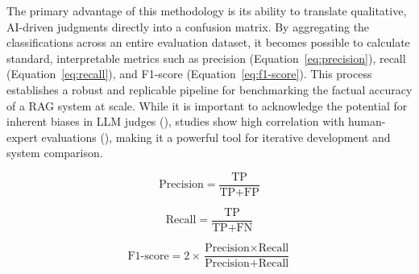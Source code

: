             The primary advantage of this methodology is its ability to translate qualitative, AI-driven judgments directly into a confusion matrix. By aggregating the classifications across an entire evaluation dataset, it becomes possible to calculate standard, interpretable metrics such as precision (Equation~\ref{eq:precision}), recall (Equation~\ref{eq:recall}), and F1-score (Equation~\ref{eq:f1-score}). This process establishes a robust and replicable pipeline for benchmarking the factual accuracy of a RAG system at scale. While it is important to acknowledge the potential for inherent biases in LLM judges (\cite{Gu2025}), studies show high correlation with human-expert evaluations (\cite{li2024llmsasjudgescomprehensivesurveyllmbased}), making it a powerful tool for iterative development and system comparison.

            \begin{equation}
                \text{Precision} = \frac{\text{TP}}{\text{TP} + \text{FP}}
                \label{eq:precision}
            \end{equation}

            \begin{equation}
                \text{Recall} = \frac{\text{TP}}{\text{TP} + \text{FN}}
                \label{eq:recall}
            \end{equation}

            \begin{equation}
                \text{F1-score} = 2 \times \frac{\text{Precision} \times \text{Recall}}{\text{Precision} + \text{Recall}}
                \label{eq:f1-score}
            \end{equation}
